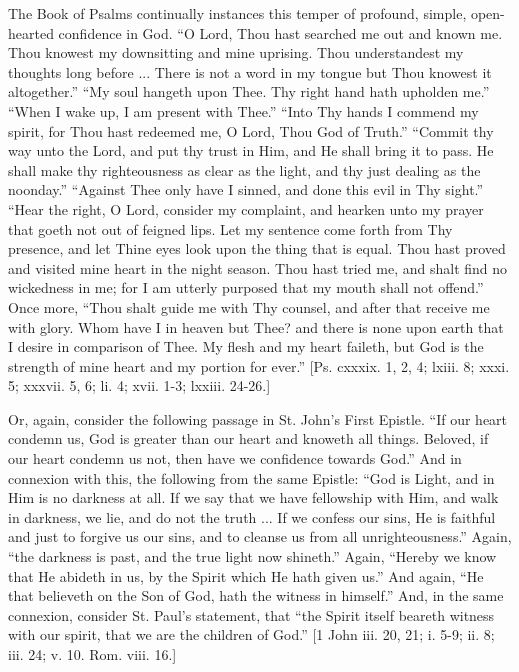 The Book of Psalms continually instances this temper of profound,
simple, open-hearted confidence in God. ``O Lord, Thou hast
searched me out and known me. Thou knowest my downsitting and mine
uprising. Thou understandest my thoughts long before ... There is not
a word in my tongue but Thou knowest it altogether.'' ``My
soul hangeth upon Thee. Thy right hand hath upholden me.''
``When I wake up, I am present with Thee.'' ``Into Thy
hands I commend my spirit, for Thou hast redeemed me, O Lord, Thou God
of Truth.'' ``Commit thy way unto the Lord, and put thy trust
in Him, and He shall bring it to pass. He shall make thy righteousness
as clear as the light, and thy just dealing as the noonday.''
``Against Thee only have I sinned, and done this evil in Thy
sight.'' ``Hear the right, O Lord, consider my complaint, and
hearken unto my prayer that goeth not out of feigned lips. Let my
sentence come forth from Thy presence, and let Thine eyes look upon
the thing that is equal. Thou hast proved and visited mine heart in
the night season. Thou hast tried me, and shalt find no wickedness in
me; for I am utterly purposed that my mouth shall not offend.''
Once more, ``Thou shalt guide me with Thy counsel, and after that
receive me with glory. Whom have I in heaven but Thee? and there is
none upon earth that I desire in comparison of Thee. My flesh and my
heart faileth, but God is the strength of mine heart and my portion
for ever.'' [Ps. cxxxix. 1, 2, 4; lxiii. 8; xxxi. 5; xxxvii. 5, 6;
li. 4; xvii. 1-3; lxxiii. 24-26.]

Or, again, consider the following passage in St. John's First
Epistle. ``If our heart condemn us, God is greater than our heart
and knoweth all things. Beloved, if our heart condemn us not, then
have we confidence towards God.'' And in connexion with this, the
following from the same Epistle: ``God is Light, and in Him is no
darkness at all. If we say that we have fellowship with Him, and walk
in darkness, we lie, and do not the truth ... If we confess our sins,
He is faithful and just to forgive us our sins, and to cleanse us from
all unrighteousness.'' Again, ``the darkness is past, and the
true light now shineth.'' Again, ``Hereby we know that He
abideth in us, by the Spirit which He hath given us.'' And again,
``He that believeth on the Son of God, hath the witness in
himself.'' And, in the same connexion, consider St. Paul's
statement, that ``the Spirit itself beareth witness with our
spirit, that we are the children of God.'' [1 John iii. 20, 21; i.
5-9; ii. 8; iii. 24; v. 10. Rom. viii. 16.]

